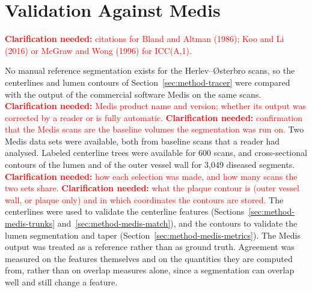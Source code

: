 \providecommand{\clarify}[1]{\textcolor{red}{\textbf{Clarification needed:} #1}}
\section{Validation Against Medis}
\label{sec:method-medis}
\clarify{citations for Bland and Altman (1986); Koo and Li (2016) or McGraw and Wong (1996) for ICC(A,1).}

No manual reference segmentation exists for the Herlev--{\O}sterbro scans, so the centerlines and lumen contours of Section~\ref{sec:method-tracer} were compared with the output of the commercial software Medis on the same scans.
\clarify{Medis product name and version; whether its output was corrected by a reader or is fully automatic.}
\clarify{confirmation that the Medis scans are the baseline volumes the segmentation was run on.}
Two Medis data sets were available, both from baseline scans that a reader had analysed.
Labeled centerline trees were available for 600 scans, and cross-sectional contours of the lumen and of the outer vessel wall for 3,049 diseased segments.
\clarify{how each selection was made, and how many scans the two sets share.}
\clarify{what the plaque contour is (outer vessel wall, or plaque only) and in which coordinates the contours are stored.}
The centerlines were used to validate the centerline features (Sections~\ref{sec:method-medis-trunks} and~\ref{sec:method-medis-match}), and the contours to validate the lumen segmentation and taper (Section~\ref{sec:method-medis-metrics}).
The Medis output was treated as a reference rather than as ground truth.
Agreement was measured on the features themselves and on the quantities they are computed from, rather than on overlap measures alone, since a segmentation can overlap well and still change a feature.

